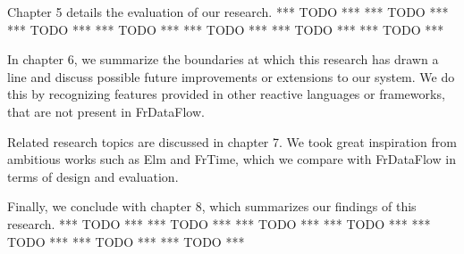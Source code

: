 Chapter 5 details the evaluation of our research. 
*** TODO ***
*** TODO ***
*** TODO ***
*** TODO ***
*** TODO ***
*** TODO ***
*** TODO ***

In chapter 6, we summarize the boundaries at which this research has drawn a line and discuss possible future improvements or extensions to our system. We do this by recognizing features provided in other reactive languages or frameworks, that are not present in FrDataFlow. 

Related research topics are discussed in chapter 7. We took great inspiration from ambitious works such as Elm and FrTime, which we compare with FrDataFlow in terms of design and evaluation. 

Finally, we conclude with chapter 8, which summarizes our findings of this research.
*** TODO ***
*** TODO ***
*** TODO ***
*** TODO ***
*** TODO ***
*** TODO ***
*** TODO ***
